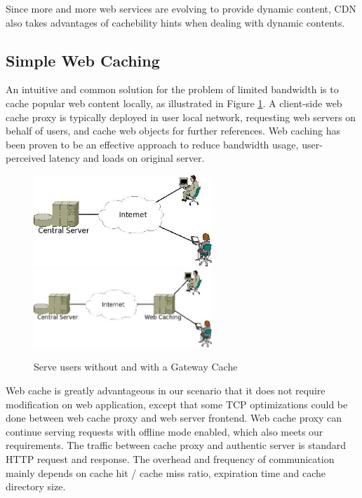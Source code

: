 Since more and more web services are evolving to provide dynamic content, CDN also takes advantages of cachebility hints when dealing with dynamic contents\cite{dilley2002globally}. 


\subsection{Simple Web Caching}
An intuitive and common solution for the problem of limited bandwidth is to cache popular web content locally, as illustrated in Figure \ref{with_cache}.
A client-side web cache proxy is typically deployed in user local network, requesting web servers on behalf of users, and cache web objects for further references. Web caching has been proven to be an effective approach to reduce bandwidth usage, user-perceived latency and loads on original server\cite{davison2001web}.

\begin{figure}[h]
\centering
\includegraphics[width=0.6\textwidth]{../images/without_caching.jpeg}
\includegraphics[width=0.6\textwidth]{../images/with_caching.jpeg}
\caption{Serve users without and with a Gateway Cache}
\label{with_cache}
\end{figure}

Web cache is greatly advantageous in our scenario that it does not require modification on web application, except that some TCP optimizations could be done between web cache proxy and web server frontend. Web cache proxy can continue serving requests with offline mode enabled, which also meets our requirements. The traffic between cache proxy and authentic server is standard HTTP request and response. The overhead and frequency of communication mainly depends on cache hit / cache miss ratio, expiration time and cache directory size.

